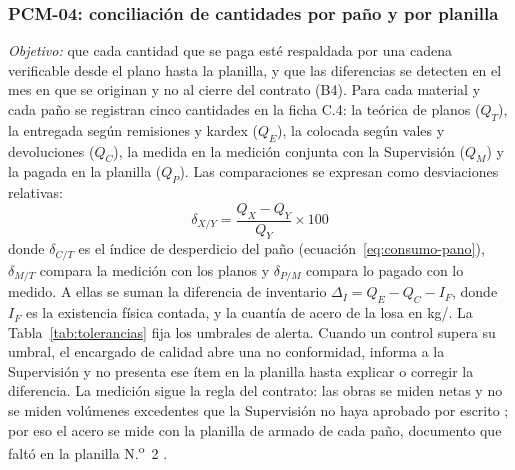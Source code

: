\subsubsection{PCM-04: conciliación de cantidades por paño y por planilla} \emph{Objetivo:} que cada cantidad que se paga esté respaldada por una cadena verificable desde el plano hasta la planilla, y que las diferencias se detecten en el mes en que se originan y no al cierre del contrato (B4). Para cada material y cada paño se registran cinco cantidades en la ficha C.4: la teórica de planos ($Q_T$), la entregada según remisiones y kardex ($Q_E$), la colocada según vales y devoluciones ($Q_C$), la medida en la medición conjunta con la Supervisión ($Q_M$) y la pagada en la planilla ($Q_P$). Las comparaciones se expresan como desviaciones relativas:
\begin{equation}
  \delta_{X/Y} = \frac{Q_X - Q_Y}{Q_Y} \times 100
  \label{eq:desviacion}
\end{equation}
donde $\delta_{C/T}$ es el índice de desperdicio del paño (ecuación~\ref{eq:consumo-pano}), $\delta_{M/T}$ compara la medición con los planos y $\delta_{P/M}$ compara lo pagado con lo medido. A ellas se suman la diferencia de inventario $\Delta_I = Q_E - Q_C - I_F$, donde $I_F$ es la existencia física contada, y la cuantía de acero de la losa en kg/\mdos{}. La Tabla~\ref{tab:tolerancias} fija los umbrales de alerta. Cuando un control supera su umbral, el encargado de calidad abre una no conformidad, informa a la Supervisión y no presenta ese ítem en la planilla hasta explicar o corregir la diferencia. La medición sigue la regla del contrato: las obras se miden netas y no se miden volúmenes excedentes que la Supervisión no haya aprobado por escrito \parencite[p.~99]{uatf2025pao2}; por eso el acero se mide con la planilla de armado de cada paño, documento que faltó en la planilla N.\textsuperscript{o}~2 \parencite[p.~20]{uatf2025pao2}.

